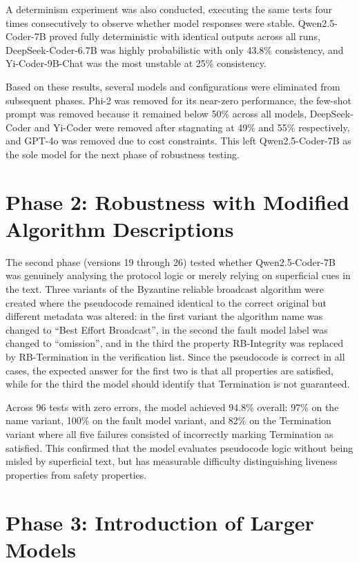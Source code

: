 \documentclass[conference]{IEEEtran}
\begin{document}
A determinism experiment was also conducted, executing the same tests four times consecutively to observe whether model responses were stable. Qwen2.5-Coder-7B proved fully deterministic with identical outputs across all runs, DeepSeek-Coder-6.7B was highly probabilistic with only 43.8\% consistency, and Yi-Coder-9B-Chat was the most unstable at 25\% consistency.

Based on these results, several models and configurations were eliminated from subsequent phases. Phi-2 was removed for its near-zero performance, the few-shot prompt was removed because it remained below 50\% across all models, DeepSeek-Coder and Yi-Coder were removed after stagnating at 49\% and 55\% respectively, and GPT-4o was removed due to cost constraints. This left Qwen2.5-Coder-7B as the sole model for the next phase of robustness testing.

\section{Phase 2: Robustness with Modified Algorithm Descriptions}

The second phase (versions 19 through 26) tested whether Qwen2.5-Coder-7B was genuinely analysing the protocol logic or merely relying on superficial cues in the text. Three variants of the Byzantine reliable broadcast algorithm were created where the pseudocode remained identical to the correct original but different metadata was altered: in the first variant the algorithm name was changed to ``Best Effort Broadcast'', in the second the fault model label was changed to ``omission'', and in the third the property RB-Integrity was replaced by RB-Termination in the verification list. Since the pseudocode is correct in all cases, the expected answer for the first two is that all properties are satisfied, while for the third the model should identify that Termination is not guaranteed.

Across 96 tests with zero errors, the model achieved 94.8\% overall: 97\% on the name variant, 100\% on the fault model variant, and 82\% on the Termination variant where all five failures consisted of incorrectly marking Termination as satisfied. This confirmed that the model evaluates pseudocode logic without being misled by superficial text, but has measurable difficulty distinguishing liveness properties from safety properties.

\section{Phase 3: Introduction of Larger Models}
\end{document}

